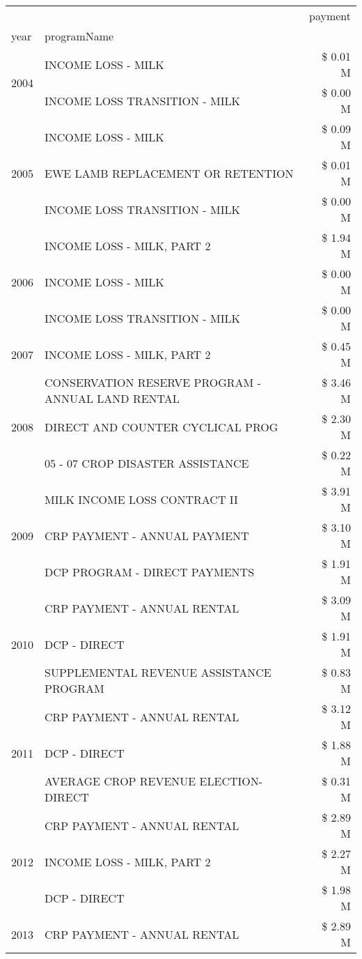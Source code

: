 \begin{tabular}{llr}
\toprule
 &  & payment \\
year & programName &  \\
\midrule
\multirow[t]{2}{*}{2004} & INCOME LOSS - MILK & \$ 0.01 M \\
 & INCOME LOSS TRANSITION - MILK & \$ 0.00 M \\
\cline{1-3}
\multirow[t]{3}{*}{2005} & INCOME LOSS - MILK & \$ 0.09 M \\
 & EWE LAMB REPLACEMENT OR RETENTION & \$ 0.01 M \\
 & INCOME LOSS TRANSITION - MILK & \$ 0.00 M \\
\cline{1-3}
\multirow[t]{3}{*}{2006} & INCOME LOSS - MILK, PART 2 & \$ 1.94 M \\
 & INCOME LOSS - MILK & \$ 0.00 M \\
 & INCOME LOSS TRANSITION - MILK & \$ 0.00 M \\
\cline{1-3}
2007 & INCOME LOSS - MILK, PART 2 & \$ 0.45 M \\
\cline{1-3}
\multirow[t]{3}{*}{2008} & CONSERVATION RESERVE PROGRAM - ANNUAL LAND RENTAL & \$ 3.46 M \\
 & DIRECT AND COUNTER CYCLICAL PROG & \$ 2.30 M \\
 & 05 - 07 CROP DISASTER ASSISTANCE & \$ 0.22 M \\
\cline{1-3}
\multirow[t]{3}{*}{2009} & MILK INCOME LOSS CONTRACT II & \$ 3.91 M \\
 & CRP PAYMENT - ANNUAL PAYMENT & \$ 3.10 M \\
 & DCP PROGRAM - DIRECT PAYMENTS & \$ 1.91 M \\
\cline{1-3}
\multirow[t]{3}{*}{2010} & CRP PAYMENT - ANNUAL RENTAL & \$ 3.09 M \\
 & DCP - DIRECT & \$ 1.91 M \\
 & SUPPLEMENTAL REVENUE ASSISTANCE PROGRAM & \$ 0.83 M \\
\cline{1-3}
\multirow[t]{3}{*}{2011} & CRP PAYMENT - ANNUAL RENTAL & \$ 3.12 M \\
 & DCP - DIRECT & \$ 1.88 M \\
 & AVERAGE CROP REVENUE ELECTION-DIRECT & \$ 0.31 M \\
\cline{1-3}
\multirow[t]{3}{*}{2012} & CRP PAYMENT - ANNUAL RENTAL & \$ 2.89 M \\
 & INCOME LOSS - MILK, PART 2 & \$ 2.27 M \\
 & DCP - DIRECT & \$ 1.98 M \\
\cline{1-3}
\multirow[t]{3}{*}{2013} & CRP PAYMENT - ANNUAL RENTAL & \$ 2.89 M \\

\end{tabular}
